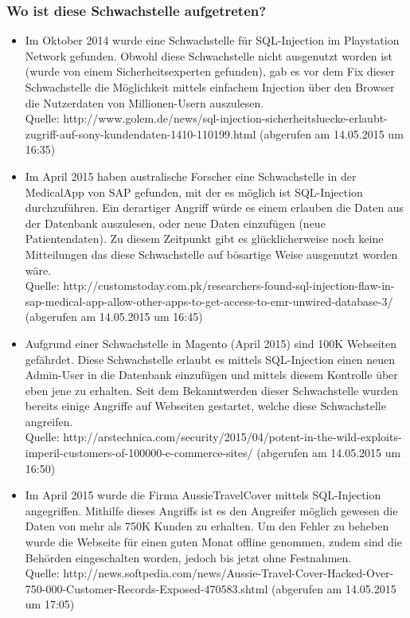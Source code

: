 \documentclass[12pt,a4paper,titlepage,oneside]{scrartcl}
\begin{document}
\subsubsection{Wo ist diese Schwachstelle aufgetreten?}

\begin{itemize}
\item Im Oktober 2014 wurde eine Schwachstelle für SQL-Injection im Playstation Network gefunden. Obwohl diese Schwachstelle nicht ausgenutzt worden ist (wurde von einem Sicherheitsexperten gefunden), gab es vor dem Fix dieser Schwachstelle die Möglichkeit mittels einfachem Injection über den Browser die Nutzerdaten von Millionen-Usern auszulesen. \\
Quelle: http://www.golem.de/news/sql-injection-sicherheitsluecke-erlaubt-zugriff-auf-sony-kundendaten-1410-110199.html (abgerufen am 14.05.2015 um 16:35)
\item Im April 2015 haben australische Forscher eine Schwachstelle in der MedicalApp von SAP gefunden, mit der es möglich ist SQL-Injection durchzuführen. Ein derartiger Angriff würde es einem erlauben die Daten aus der Datenbank auszulesen, oder neue Daten einzufügen (neue Patientendaten). Zu diesem Zeitpunkt gibt es glücklicherweise noch keine Mitteilungen das diese Schwachstelle auf bösartige Weise ausgenutzt worden wäre. \\
Quelle: http://customstoday.com.pk/researchers-found-sql-injection-flaw-in-sap-medical-app-allow-other-apps-to-get-access-to-emr-unwired-database-3/ (abgerufen am 14.05.2015 um 16:45)
\item Aufgrund einer Schwachstelle in Magento (April 2015) sind 100K Webseiten gefährdet. Diese Schwachstelle erlaubt es mittels SQL-Injection einen neuen Admin-User in die Datenbank einzufügen und mittels diesem Kontrolle über eben jene zu erhalten. Seit dem Bekanntwerden dieser Schwachstelle wurden bereits einige Angriffe auf Webseiten gestartet, welche diese Schwachstelle angreifen. \\
Quelle: http://arstechnica.com/security/2015/04/potent-in-the-wild-exploits-imperil-customers-of-100000-e-commerce-sites/ (abgerufen am 14.05.2015 um 16:50)
\item Im April 2015 wurde die Firma AussieTravelCover mittels SQL-Injection angegriffen. Mithilfe dieses Angriffs ist es den Angreifer möglich gewesen die Daten von mehr als 750K Kunden zu erhalten. Um den Fehler zu beheben wurde die Webseite für einen guten Monat offline genommen, zudem sind die Behörden eingeschalten worden, jedoch bis jetzt ohne Festnahmen. \\
Quelle: http://news.softpedia.com/news/Aussie-Travel-Cover-Hacked-Over-750-000-Customer-Records-Exposed-470583.shtml (abgerufen am 14.05.2015 um 17:05)
\end{itemize}
\end{document}
